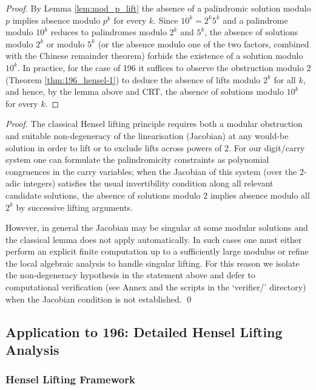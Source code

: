 \documentclass[12pt,a4paper]{article}
\begin{document}
\begin{proof}
By Lemma \ref{lem:mod_p_lift} the absence of a palindromic solution modulo $p$ implies absence modulo $p^k$ for every $k$. Since $10^k=2^k5^k$ and a palindrome modulo $10^k$ reduces to palindromes modulo $2^k$ and $5^k$, the absence of solutions modulo $2^k$ or modulo $5^k$ (or the absence modulo one of the two factors, combined with the Chinese remainder theorem) forbids the existence of a solution modulo $10^k$. In practice, for the case of 196 it suffices to observe the obstruction modulo 2 (Theorem \ref{thm:196_hensel-1}) to deduce the absence of lifts modulo $2^k$ for all $k$, and hence, by the lemma above and CRT, the absence of solutions modulo $10^k$ for every $k$.
\end{proof}

\begin{proof}
The classical Hensel lifting principle requires both a modular obstruction and suitable non-degeneracy of the linearisation (Jacobian) at any would-be solution in order to lift or to exclude lifts across powers of 2. For our digit/carry system one can formulate the palindromicity constraints as polynomial congruences in the carry variables; when the Jacobian of this system (over the 2-adic integers) satisfies the usual invertibility condition along all relevant candidate solutions, the absence of solutions modulo $2$ implies absence modulo all $2^k$ by successive lifting arguments.

However, in general the Jacobian may be singular at some modular solutions and the classical lemma does not apply automatically. In such cases one must either perform an explicit finite computation up to a sufficiently large modulus or refine the local algebraic analysis to handle singular lifting. For this reason we isolate the non-degeneracy hypothesis in the statement above and defer to computational verification (see Annex and the scripts in the `verifier/' directory) when the Jacobian condition is not established.
\qed
\end{proof}

\subsection{Application to 196: Detailed Hensel Lifting Analysis}

\subsubsection{Hensel Lifting Framework}
\end{document}
